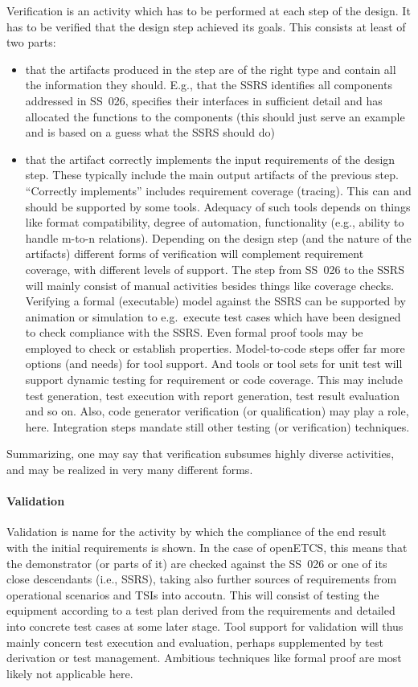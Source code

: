 \documentclass{../template/openetcs_report}
\begin{document}
Verification is an activity which has to be performed at each step of
the design. It has to be verified that the design step achieved its
goals. This consists at least of two parts:
\begin{itemize}
\item that the artifacts produced in the step are of the right type
  and contain all the information they should. E.g., that the SSRS
  identifies all components addressed in SS~026, specifies their
  interfaces in sufficient detail and has allocated the functions to
  the components (this should just serve an example and is based on a
  guess what the SSRS should do)
\item that the artifact correctly implements the input requirements of
  the design step. These typically include the main output artifacts
  of the previous step. ``Correctly implements'' includes requirement
  coverage (tracing). This can and should be supported by some
  tools. Adequacy of such tools depends on things like format
  compatibility, degree of automation, functionality (e.g., ability to
  handle m-to-n relations). Depending on the design step (and the
  nature of the artifacts) different forms of verification will
  complement requirement coverage, with different levels of
  support. The step from SS~026 to the SSRS will mainly consist of
  manual activities besides things like coverage checks. Verifying a
  formal (executable) model against the SSRS can be supported by
  animation or simulation to e.g.\ execute test cases which have been
  designed to check compliance with the SSRS. Even formal proof tools
  may be employed to check or establish properties. Model-to-code steps
  offer far more options (and needs) for tool support. And tools or
  tool sets for unit test will support dynamic testing for requirement
  or code coverage. This may include test generation, test execution
  with report generation, test result evaluation and so on. Also, code
  generator verification (or qualification) may play a role,
  here. Integration steps mandate still other testing (or
  verification) techniques.
\end{itemize}
Summarizing, one may say that verification subsumes highly diverse
activities, and may be realized in very many different forms.

\paragraph{Validation}
Validation is name for the activity by which the compliance of the end
result with the initial requirements is shown. In the case of
openETCS, this means that the demonstrator (or parts of it) are
checked against the SS~026 or one of its close descendants (i.e.,
SSRS), taking also further sources of requirements from operational
scenarios and TSIs into accoutn. This will consist of testing the
equipment according to a test plan derived from the requirements and
detailed into concrete test cases at some later stage. Tool support
for validation will thus mainly concern test execution and evaluation,
perhaps supplemented by test derivation or test management. Ambitious
techniques like formal proof are most likely not applicable here.
\end{document}

